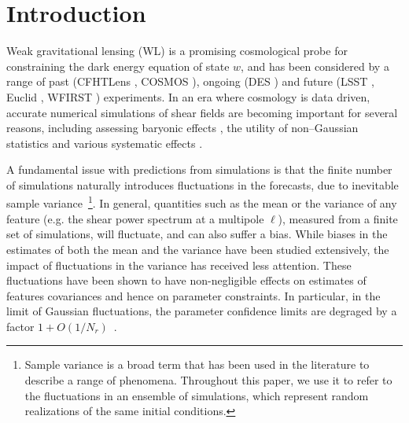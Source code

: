 \documentclass[reprint,aps,prd,superscriptaddress,showkeys,showpacs]{revtex4-1}
\begin{document}

\maketitle



\section{Introduction}
%
Weak gravitational lensing (WL) is a promising cosmological probe for
constraining the dark energy equation of state $w$, and has been
considered by a range of past (CFHTLens \citep{cfht1,cfht2}, COSMOS
\citep{cosmos}), ongoing (DES \citep{DES}) and future (LSST
\citep{LSST}, Euclid \citep{Euclid}, WFIRST \citep{WFIRST})
experiments. In an era where cosmology is data driven, accurate
numerical simulations of shear fields are becoming important for
several reasons, including assessing baryonic effects
\citep{BaryonXiuyuan,BaryonSemboloni,BaryonsWhite,BaryonsKnox,BaryonsZentner1,BaryonsZentner2},
the utility of non--Gaussian statistics
\citep{PeaksJan,MinkJan,MinkPetri,NG-Marian,NG-Jain1,NG-Jain2,NG-Jain3,NG-Refregier,NG-Dietrich}
and various systematic effects
\citep{MinkShirasaki,Sys-Bard,Sys-Chang,Sys-Huterer}.

A fundamental issue with predictions from simulations is that the
finite number of simulations naturally introduces fluctuations in the
forecasts, due to inevitable sample variance~\footnote{Sample variance is a broad term that has been used in the literature to describe a range of phenomena. Throughout this paper, we use it to refer to the fluctuations in an ensemble of simulations, which represent random realizations of the same initial conditions.}. In general,
quantities such as the mean or the variance of any feature (e.g. the
shear power spectrum at a multipole $\ell$), measured from a finite
set of simulations, will fluctuate, and can also suffer a bias.  While
biases in the estimates of both the mean and the variance have been
studied extensively, the impact of fluctuations in the variance has
received less attention.  These fluctuations have been shown to have non-negligible effects on estimates of
features covariances and hence on parameter constraints. In
particular, in the limit of Gaussian fluctuations, the parameter
confidence limits are degraged by a factor
$1+O(1/N_r)$~\citep{DodelsonSchneider13,Taylor12}.
\end{document}
